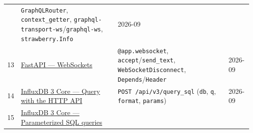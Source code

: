 \begin{longtable}[]{@{}llll@{}}
\begin{minipage}[t]{0.22\columnwidth}
\end{minipage} & \begin{minipage}[t]{0.22\columnwidth}\raggedright
\texttt{GraphQLRouter}, \texttt{context\_getter}, \texttt{graphql-transport-ws}/\allowbreak\texttt{graphql-ws}, \texttt{strawberry.Info}\strut
\end{minipage} & \begin{minipage}[t]{0.22\columnwidth}\raggedright
2026-09\strut
\end{minipage}\tabularnewline
\begin{minipage}[t]{0.22\columnwidth}\raggedright
13\strut
\end{minipage} & \begin{minipage}[t]{0.22\columnwidth}\raggedright
\href{https://fastapi.tiangolo.com/advanced/websockets/}{FastAPI --- WebSockets}\strut
\end{minipage} & \begin{minipage}[t]{0.22\columnwidth}\raggedright
\texttt{@app.websocket}, \texttt{accept}/\allowbreak\texttt{send\_text}, \texttt{WebSocketDisconnect}, \texttt{Depends}/\allowbreak\texttt{Header}\strut
\end{minipage} & \begin{minipage}[t]{0.22\columnwidth}\raggedright
2026-09\strut
\end{minipage}\tabularnewline
\begin{minipage}[t]{0.22\columnwidth}\raggedright
14\strut
\end{minipage} & \begin{minipage}[t]{0.22\columnwidth}\raggedright
\href{https://docs.influxdata.com/influxdb3/core/query-data/execute-queries/influxdb-v3-api/}{InfluxDB 3 Core --- Query with the HTTP API}\strut
\end{minipage} & \begin{minipage}[t]{0.22\columnwidth}\raggedright
\texttt{POST\ /\allowbreak{}api/\allowbreak{}v3/\allowbreak{}query\_\allowbreak{}sql} (\texttt{db}, \texttt{q}, \texttt{format}, \texttt{params})\strut
\end{minipage} & \begin{minipage}[t]{0.22\columnwidth}\raggedright
2026-09\strut
\end{minipage}\tabularnewline
\begin{minipage}[t]{0.22\columnwidth}\raggedright
15\strut
\end{minipage} & \begin{minipage}[t]{0.22\columnwidth}\raggedright
\href{https://docs.influxdata.com/influxdb3/core/query-data/sql/parameterized-queries/}{InfluxDB 3 Core --- Parameterized SQL queries}\strut

\end{minipage}
\end{longtable}
